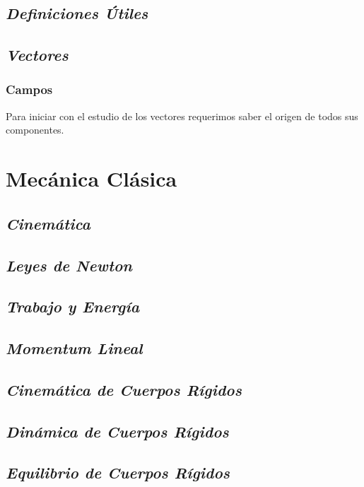     \section{\textit{Definiciones Útiles}}
    \lipsum[1-3]
    \section{\textit{Vectores}}
    \subsection{Campos}
    Para iniciar con el estudio de los vectores requerimos saber el origen de todos sus componentes. 
\chapter{Mecánica Clásica}
        \lipsum[1-2]
        \newpage
    \section{\textit{Cinemática}}
    \lipsum[1-5]
    \section{\textit{Leyes de Newton}}
    \lipsum[1-5]
    \section{\textit{Trabajo y Energía}}
    \lipsum[1-5]
    \section{\textit{Momentum Lineal}}
    \lipsum[1-5]
    \section{\textit{Cinemática de Cuerpos Rígidos}}
    \lipsum[1-5]
    \section{\textit{Dinámica de Cuerpos Rígidos}}
    \lipsum[1-5]
    \section{\textit{Equilibrio de Cuerpos Rígidos}}
    \lipsum[1-5]
